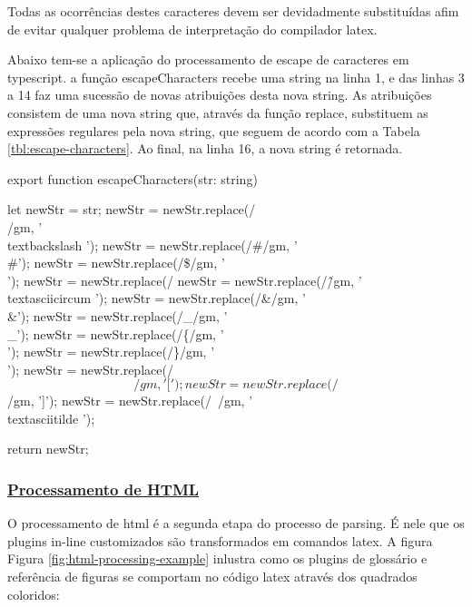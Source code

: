 Todas as ocorrências destes caracteres devem ser devidadmente
substituídas afim de evitar qualquer problema de interpretação do
compilador
\acrshort{latex}.


Abaixo tem-se a aplicação do processamento de escape de caracteres
em typescript. a função escapeCharacters recebe uma string na linha 1,
e das linhas 3 a 14 faz uma sucessão de novas atribuições desta nova string.
As atribuições consistem de uma nova string que, através da função replace,
substituem as expressões regulares pela nova string, que seguem de acordo
com a
Tabela \ref{tbl:escape-characters}.
Ao final, na linha 16, a nova string é retornada.

\begin{codeEscape}
export function escapeCharacters(str: string){
    let newStr = str;
    newStr = newStr.replace(/\\/gm, '\\textbackslash ');
    newStr = newStr.replace(/#/gm, '\\#');
    newStr = newStr.replace(/\$/gm, '\\$$');
    newStr = newStr.replace(/%
    newStr = newStr.replace(/\^/gm, '\\textasciicircum ');
    newStr = newStr.replace(/&/gm, '\\&');
    newStr = newStr.replace(/_/gm, '\\_');
    newStr = newStr.replace(/\{/gm, '\\{');
    newStr = newStr.replace(/\}/gm, '\\}');
    newStr = newStr.replace(/\[/gm, '{[}');
    newStr = newStr.replace(/\]/gm, '{]}');
    newStr = newStr.replace(/~/gm, '\\textasciitilde ');

    return newStr;
}
\end{codeEscape}

\subsubsection{\underline{Processamento de HTML}}

O processamento de
\acrshort{html}
é a segunda etapa do processo de parsing. É
nele que os plugins in-line customizados são transformados
em comandos
\acrshort{latex}.
A figura
Figura \ref{fig:html-processing-example}
inlustra como os plugins de glossário e referência de figuras
se comportam no código
\acrshort{latex}
através dos quadrados coloridos:

